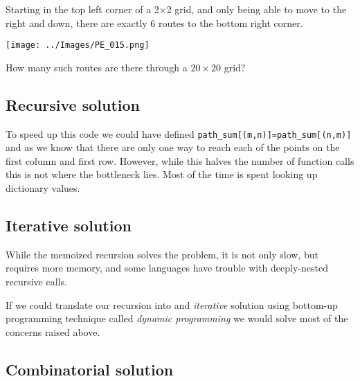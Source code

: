 

\begin{ProjectEuler}{15}
  Starting in the top left corner of a 2×2 grid, and only being able to move to
  the right and down, there are exactly 6 routes to the bottom right corner.
  \begin{center}
    \texttt{[image: ../Images/PE\_015.png]}
  \end{center}
  How many such routes are there through a $20\times20$ grid?
\end{ProjectEuler}

\subsection{Recursive solution}



To speed up this code we could have defined
\lstinline|path_sum[(m,n)]=path_sum[(n,m)]| and as we know that there are only
one way to reach each of the points on the first column and first row. However,
while this halves the number of function calls this is not where the bottleneck
lies. Most of the time is spent looking up dictionary values. 

\newpage

\subsection{Iterative solution}

While the memoized recursion solves the problem, it is not only slow, but
requires more memory, and some languages have trouble with deeply-nested
recursive calls.

If we could translate our recursion into and \emph{iterative} solution using
bottom-up programming technique called \emph{dynamic programming} we would solve
most of the concerns raised above. 


                 \subsection{Combinatorial solution}
                 

